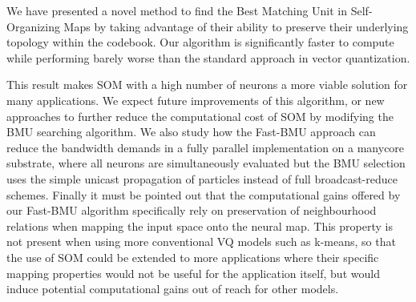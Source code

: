 	We have presented a novel method to find the Best Matching Unit in Self-Organizing Maps by taking advantage of their ability to preserve their underlying topology within the codebook. Our algorithm is significantly faster to compute while performing barely worse than the standard approach in vector quantization. %

	This result makes SOM with a high number of neurons a more viable solution for many applications. We expect future improvements of this algorithm, or new approaches to further reduce the computational cost of SOM by modifying the BMU searching algorithm. We also study how the Fast-BMU approach can reduce the bandwidth demands in a fully parallel implementation on a manycore substrate, where all neurons are simultaneously evaluated but the BMU selection uses the simple unicast propagation of particles instead of full broadcast-reduce schemes. Finally it must be pointed out that the computational gains offered by our Fast-BMU algorithm specifically rely on preservation of neighbourhood relations when mapping the input space onto the neural map. This property is not present when using more conventional VQ models such as k-means, so that the use of SOM could be extended to more applications where their specific mapping properties would not be useful for the application itself, but would induce potential computational gains out of reach for other models.
		

